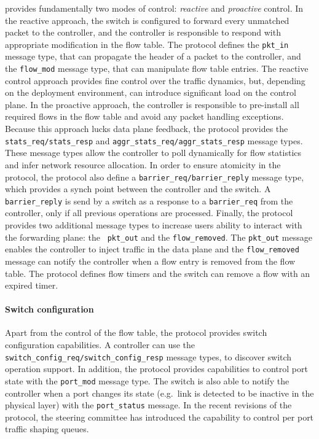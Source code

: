 \of provides fundamentally two modes of control: \emph{reactive} and 
\emph{proactive} control. In the reactive approach, the switch is configured to
forward every unmatched packet to the controller, and the controller is
responsible to respond with appropriate modification in the flow table. The
protocol defines the {\tt pkt\_in} message type, that can propagate the header
of a packet to the controller, and the {\tt flow\_mod} message type, that can
manipulate flow table entries. The reactive control approach provides 
fine control over the traffic dynamics, but, depending on the deployment
environment, can introduce significant load on the control plane. In the proactive
approach, the controller is responsible to pre-install all required flows in the
flow table and avoid any packet handling exceptions. Because this approach
lucks data plane feedback, the \of protocol provides the {\tt stats\_req/stats\_resp}
and {\tt aggr\_stats\_req/aggr\_stats\_resp} message types. These message types allow
the controller to poll dynamically for flow statistics and infer network
resource allocation. In order to ensure atomicity in the protocol, the protocol
also define a {\tt barrier\_req/barrier\_reply} message type, which provides a synch 
point between the controller and the switch. A {\tt barrier\_reply} is send by a
switch as a response to a {\tt barrier\_req} from the controller, only if all previous 
operations are processed. 
Finally, the \of protocol provides two additional message
types to increase users ability to interact with the forwarding plane: the {\tt
  pkt\_out} and the {\tt flow\_removed}. The {\tt pkt\_out} message enables the
controller to inject traffic in the data plane and the {\tt flow\_removed} message
can notify the controller when a flow entry is removed from the flow table. The
protocol defines flow timers and the switch can remove a flow with an expired
timer. 

\paragraph{Switch configuration} 

Apart from the control of the flow table, the \of protocol provides switch
configuration capabilities. A controller can use the {\tt
  switch\_config\_req/switch\_config\_resp} message types, to discover switch \of
operation support.  In addition, the protocol provides capabilities to control
port state with the {\tt port\_mod} message type. The switch is also able to
notify the controller when a port changes its state (e.g.~link is detected to be
inactive in the physical layer) with the {\tt port\_status} message. In the
recent revisions of the protocol, the steering committee has introduced the
capability to control per port traffic shaping queues. 

